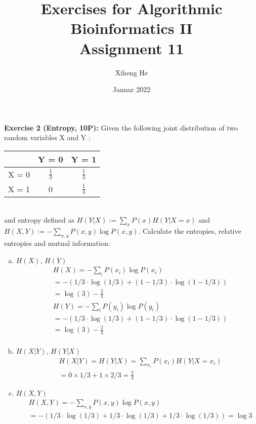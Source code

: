 \documentclass[12pt]{article}
\title{Exercises for Algorithmic Bioinformatics II\\
Assignment 11}
\author{Xiheng He}
\date{Januar 2022}
\begin{document}
{\let\newpage\relax\maketitle}
\begin{flushleft}
\textbf{Exercise 2 (Entropy, 10P):}
\newline
Given the following joint distribution of two random variables X and Y :
\newline
\begin{tabular}{c|cc}
    & Y = 0 & Y = 1 \\
    \hline
    X = 0 & $\frac{1}{3}$ & $\frac{1}{3}$ \\
    X = 1 & 0 & $\frac{1}{3}$
\end{tabular}
\newline \\
and entropy defined as $H(Y|X) := \sum_x P(x)H(Y|X = x)$ and $H(X,Y) := -\sum_{x,y} P(x,y)\log P(x,y)$.
Calculate the entropies, relative entropies and mutual information:
\begin{enumerate}[(a)]
    \item $H(X)$, $H(Y)$
    \begin{align*}
        & H(X) = -\sum_{i} P(x_i) \log P(x_i) \\
        & = -(1/3 \cdot \log(1/3) + (1 - 1/3) \cdot \log (1 - 1/3)) \\
        & = \log(3) - \displaystyle \frac{2}{3} \\
        & H(Y) = -\sum_{i} P(y_i) \log P(y_i) \\
        & = -(1/3 \cdot \log(1/3) + (1 - 1/3) \cdot \log (1 - 1/3)) \\
        & = \log(3) - \displaystyle \frac{2}{3} \\
    \end{align*}
    \item $H(X|Y)$, $H(Y|X)$
    \begin{align*}
        & H(X|Y) = H(Y|X) = \sum_{x_i} P(x_i) H(Y | X = x_i) \\
        & = 0 \times 1/3 + 1 \times 2/3 = \displaystyle \frac{2}{3}
    \end{align*}
    \item $H(X,Y)$
    \begin{align*}
        & H(X,Y) = -\sum_{x,y} P(x,y) \log P(x,y) \\
        & = - (1/3 \cdot \log (1/3) + 1/3 \cdot \log(1/3) + 1/3 \cdot \log(1/3)) = \log 3
    \end{align*}

\end{enumerate}
\end{flushleft}
\end{document}
